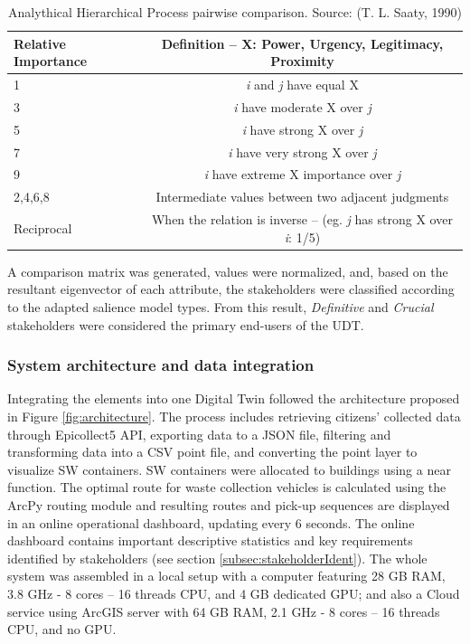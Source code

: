 \documentclass[authoryear,preprint,review,11pt,doubleblind]{elsarticle}
\begin{document}
    \begin{table}[h!]
        \centering
        \caption{Analythical Hierarchical Process pairwise comparison. Source: (T. L. Saaty, 1990)}
        \small
        \label{tab:Saaty}
        \begin{tabularx}{\linewidth}{X c}
            \toprule
            Relative Importance&Definition – X: Power, Urgency, Legitimacy, Proximity\\
            \midrule
            1&\textit{i} and \textit{j} have equal X\\
            3&\textit{i} have moderate X over \textit{j}\\
            5&\textit{i} have strong X over \textit{j}\\
            7&\textit{i} have very strong X over \textit{j}\\
            9&\textit{i} have extreme X importance over \textit{j}\\
            2,4,6,8&Intermediate values between two adjacent judgments\\
            Reciprocal&When the relation is inverse –
            (eg. \textit{j} has strong X over \textit{i}: 1/5)\\
            \bottomrule        
        \end{tabularx}
    \end{table}
    
    A comparison matrix was generated, values were normalized, and, based on the resultant eigenvector of each attribute, the stakeholders were classified according to the adapted salience model types. From this result, \textit{Definitive} and \textit{Crucial} stakeholders were considered the primary end-users of the UDT.

    \subsubsection{System architecture and data integration}\label{subsubsec:SystemArch}
    Integrating the elements into one Digital Twin followed the architecture proposed in Figure \ref{fig:architecture}. The process includes retrieving citizens' collected data through Epicollect5 API, exporting data to a JSON file, filtering and transforming data into a CSV point file, and converting the point layer to visualize SW containers. SW containers were allocated to buildings using a near function. The optimal route for waste collection vehicles is calculated using the ArcPy routing module and resulting routes and pick-up sequences are displayed in an online operational dashboard, updating every 6 seconds. The online dashboard contains important descriptive statistics and key requirements identified by stakeholders (see section \ref{subsec:stakeholderIdent}). The whole system was assembled in a local setup with a computer featuring 28 GB RAM, 3.8 GHz - 8 cores – 16 threads CPU, and 4 GB dedicated GPU; and also a  Cloud service using  ArcGIS server
with 64 GB RAM, 2.1 GHz - 8 cores – 16 threads CPU, and no GPU.
\end{document}
